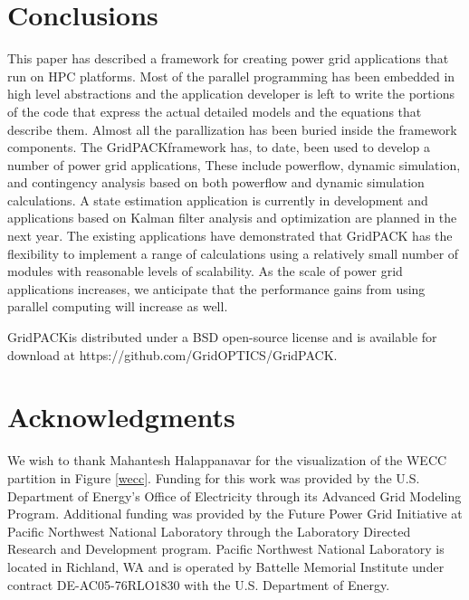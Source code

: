 \documentclass[preprint]{acm_proc_article-sp}
\begin{document}
\section{Conclusions}
This paper has described a framework for creating power grid applications that
run on HPC platforms. Most of the parallel programming has been embedded in high
level abstractions and the application developer is left to write the portions
of the code that express the actual detailed models and the equations that describe
them. Almost all the parallization has been buried inside the
framework components. The GridPACK\texttrademark framework has, to date, been
used to develop a number of power grid applications, These include powerflow,
dynamic simulation, and contingency analysis based on both powerflow and dynamic
simulation calculations. A state estimation application is currently in
development and applications based on Kalman filter analysis and optimization
are planned in the next year. The existing applications have demonstrated that
GridPACK has the flexibility to implement a range of calculations using a
relatively small number of modules with reasonable levels of scalability. As the
scale of power grid applications increases, we anticipate that the performance
gains from using parallel computing will increase as well.

GridPACK\texttrademark is distributed under a BSD open-source license and is
available for download at https://github.com/GridOPTICS/GridPACK.

\section{Acknowledgments}
We wish to thank Mahantesh Halappanavar for the visualization of the WECC
partition in Figure \ref{wecc}.
Funding for this work was provided by the U.S. Department of Energy's Office of
Electricity through its Advanced Grid Modeling Program.
Additional funding was provided by the Future Power Grid Initiative at Pacific
Northwest National Laboratory through the Laboratory Directed Research and
Development program.
Pacific Northwest National Laboratory is located in Richland, WA and is operated
by Battelle Memorial Institute under contract DE-AC05-76RLO1830 with the U.S.
Department of Energy.



\end{document}
